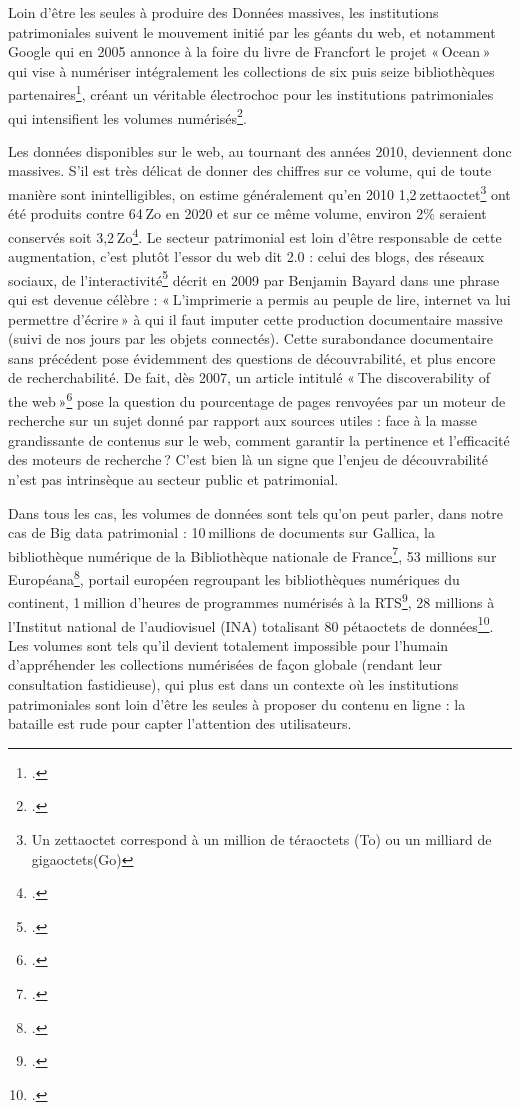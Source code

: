 Loin d’être les seules à produire des Données massives, les institutions patrimoniales suivent le mouvement initié par les géants du web, et notamment Google qui en 2005 annonce à la foire du livre de Francfort le projet « Ocean » qui vise à numériser intégralement les collections de six puis seize bibliothèques partenaires\footcite{ertzscheid2019}, créant un véritable électrochoc pour les institutions patrimoniales qui intensifient les volumes numérisés\footcite{bermes2024}.

Les données disponibles sur le web, au tournant des années 2010, deviennent donc massives. S’il est très délicat de donner des chiffres sur ce volume, qui de toute manière sont inintelligibles, on estime généralement qu’en 2010 1,2 zettaoctet\footnote{Un zettaoctet correspond à un million de téraoctets (To) ou un milliard de gigaoctets(Go)} ont été produits contre 64 Zo en 2020 et sur ce même volume, environ 2\% seraient conservés soit 3,2 Zo\footcite{zotero-284}. Le secteur patrimonial est loin d’être responsable de cette augmentation, c’est plutôt l’essor du web dit 2.0 : celui des blogs, des réseaux sociaux, de l’interactivité\footcite{zotero-283} décrit en 2009 par Benjamin Bayard dans une phrase qui est devenue célèbre : « L’imprimerie a permis au peuple de lire, internet va lui permettre d’écrire » à qui il faut imputer cette production documentaire massive (suivi de nos jours par les objets connectés). Cette surabondance documentaire sans précédent pose évidemment des questions de découvrabilité, et plus encore de recherchabilité. De fait, dès 2007, un article intitulé « The discoverability of the web »\footcite{dasgupta2007} pose la question du pourcentage de pages renvoyées par un moteur de recherche sur un sujet donné par rapport aux sources utiles : face à la masse grandissante de contenus sur le web, comment garantir la pertinence et l’efficacité des moteurs de recherche ? C’est bien là un signe que l’enjeu de découvrabilité n’est pas intrinsèque au secteur public et patrimonial.

Dans tous les cas, les volumes de données sont tels qu’on peut parler, dans notre cas de Big data patrimonial : 10 millions de documents sur Gallica, la bibliothèque numérique de la Bibliothèque nationale de France\footcite{zotero-281}, 53 millions sur Européana\footcite{zotero-280}, portail européen regroupant les bibliothèques numériques du continent, 1 million d’heures de programmes numérisés à la RTS\footcite{sonderegger2024}, 28 millions à l’Institut national de l’audiovisuel (INA) totalisant 80 pétaoctets de données\footcite{alquier2024}. Les volumes sont tels qu’il devient totalement impossible pour l’humain d’appréhender les collections numérisées de façon globale (rendant leur consultation fastidieuse), qui plus est dans un contexte où les institutions patrimoniales sont loin d’être les seules à proposer du contenu en ligne : la bataille est rude pour capter l’attention des utilisateurs.

